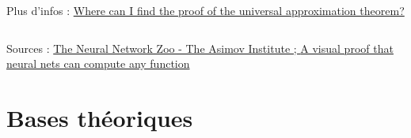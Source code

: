 \documentclass[aspectratio=169]{beamer}
\begin{document}
\begin{frame}
\begin{columns}[t]
\begin{column}{0.65\textwidth}
\begin{center}
      \end{center}
      \vspace{-\baselineskip}
      Plus d'infos : \href{https://ai.stackexchange.com/questions/13317/where-can-i-find-the-proof-of-the-universal-approximation-theorem/13319}
      {Where can I find the proof of the universal approximation theorem?}
    \end{column}
  \end{columns}

  {\tiny \vspace{0.5\baselineskip}
  Sources : \href{https://www.asimovinstitute.org/neural-network-zoo/}
  {The Neural Network Zoo - The Asimov Institute ; 
  \href{http://neuralnetworksanddeeplearning.com/chap4.html}
  {A visual proof that neural nets can compute any function}
  }
  }
\end{frame}

\section{Bases théoriques}
\end{document}
